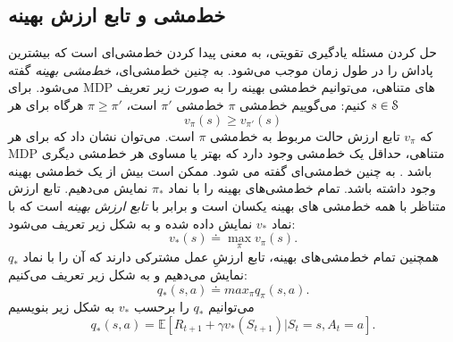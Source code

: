 \subsection{خط‌مشی و تابع ارزش بهینه}
حل کردن مسئله یادگیری تقویتی، به معنی پیدا کردن خط‌مشی‌ای است که بیشترین پاداش را در طول زمان موجب می‌شود.	به چنین خط‌مشی‌ای، 
\textit{خط‌مشی بهینه} 
گفته می‌شود. برای
 MDP‌ 
 های متناهی، می‌توانیم خط‌مشی بهینه را به صورت زیر تعریف کنیم:
می‌گوییم خط‌مشی $\pi$  خط‌مشی 
$\pi'$
است،
$\pi \ge \pi'$
هرگاه برای هر 
$s \in \EuScript{S}$
$$v_\pi(s) \ge v_{\pi'}(s)$$
که $v_\pi$ تابع ارزش حالت مربوط به خط‌مشی $\pi$ است.
 می‌توان نشان داد که برای هر MDP متناهی، حداقل یک خط‌مشی وجود دارد که بهتر یا مساوی هر خط‌مشی دیگری باشد
\cite{suttonbook}.
 به چنین خط‌مشی‌ای 
\textit{}
 گفته می‌ شود. ممکن است بیش از یک خط‌مشی بهینه وجود داشته باشد. تمام خط‌مشی‌های بهینه را با نماد $\pi_*$  نمایش می‌دهیم. تابع ارزش متناظر با همه خط‌مشی\nf
های بهینه یکسان است و برابر با 
\textit{تابع ارزش بهینه}
 است که با نماد $v_*$ نمایش داده شده و به شکل زیر تعریف می‌شود:
$$v_*(s) \doteq \max_{\pi} v_\pi(s).$$
همچنین تمام خط‌مشی‌‌های بهینه، تابع ارزشِ عمل مشترکی دارند که آن را با نماد $q_*$ نمایش می‌دهیم و به شکل زیر تعریف می‌کنیم:
$$q_*(s,a) \doteq max_{\pi} q_\pi(s,a).$$
می‌توانیم $q_*$ را برحسب $v_*$ به شکل زیر بنویسیم \cite{suttonbook}
\begin{equation}
q_* (s,a) = \mathbb{E}[R_{t+1} + \gamma v_*(S_{t+1})| S_t=s, A_t=a].
\end{equation}

